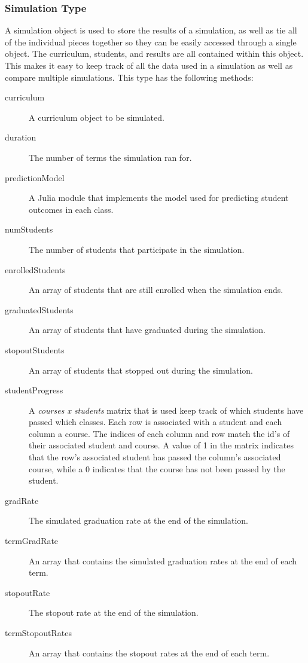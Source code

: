 \documentclass[botnum, fleqn]{unmeethesis}
\begin{document}
      


    \subsubsection{Simulation Type}
      A simulation object is used to store the results of a simulation, as well as tie all of the individual pieces together so they can be easily accessed through a single object. The curriculum, students, and results are all contained within this object. This makes it easy to keep track of all the data used in a simulation as well as compare multiple simulations. This type has the following methods:

      \begin{description}
        \item [curriculum] A curriculum object to be simulated.
        \item [duration] The number of terms the simulation ran for.
        \item [predictionModel] A Julia module that implements the model used for predicting student outcomes in each class.
        \item [numStudents] The number of students that participate in the simulation.
        \item [enrolledStudents] An array of students that are still enrolled when the simulation ends.
        \item [graduatedStudents] An array of students that have graduated during the simulation.
        \item [stopoutStudents] An array of students that stopped out during the simulation.
        \item [studentProgress] A \textit{courses x students} matrix that is used keep track of which students have passed which classes. Each row is associated with a student and each column a course. The indices of each column and row match the id's of their associated student and course. A value of 1 in the matrix indicates that the row's associated student has passed the column's associated course, while a 0 indicates that the course has not been passed by the student.
        \item [gradRate] The simulated graduation rate at the end of the simulation.
        \item [termGradRate] An array that contains the simulated graduation rates at the end of each term.
        \item [stopoutRate] The stopout rate at the end of the simulation.
        \item [termStopoutRates] An array that contains the stopout rates at the end of each term.
      \end{description}
\end{document}
